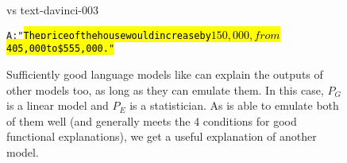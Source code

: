 \begin{figure}
\begin{AIbox}{{\DV} vs text-davinci-003}
{\begin{alltt}
A: "\hl{The price of the house would increase by $150,000, from $405,000 to \$555,000."}

\end{alltt}}\vspace{-6px}
\end{AIbox}
\caption{Sufficiently good language models like {\DV} can explain the outputs of other models too, as long as they can emulate them. In this case, $P_G$ is a linear model and $P_E$ is a statistician. As {\DV} is able to emulate both of them well (and generally meets the 4 conditions for good functional explanations), we get a useful explanation of another model.}
\label{fig:interpret-linear-model}
\end{figure}